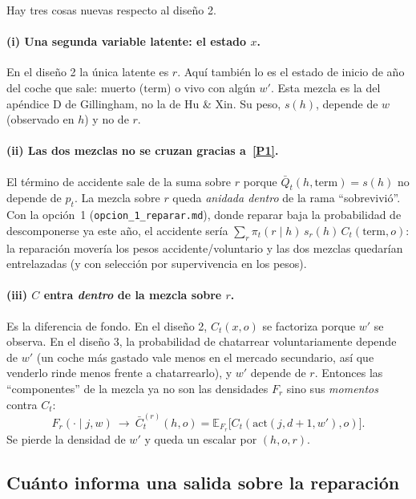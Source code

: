 \documentclass[11pt]{article}
\newcommand{\code}[1]{\texttt{\small #1}}
\newcommand{\act}{\mathrm{act}}
\newcommand{\term}{\mathrm{term}}
\newcommand{\1}{\mathbf{1}}
\newcommand{\Qbar}{\bar Q}
\begin{document}
Hay tres cosas nuevas respecto al diseño 2.

\paragraph{(i) Una segunda variable latente: el estado $x$.} En el diseño 2 la única latente
es $r$. Aquí también lo es el estado de inicio de año del coche que sale: muerto
($\term$) o vivo con algún $w'$. Esta mezcla es la del apéndice D de Gillingham, no la de
Hu \& Xin. Su peso, $s(h)$, depende de $w$ (observado en $h$) y no de $r$.

\paragraph{(ii) Las dos mezclas no se cruzan gracias a~\ref{P1}.} El término de accidente
sale de la suma sobre $r$ porque $\Qbar_t(h,\term)=s(h)$ no depende de $p_t$. La mezcla
sobre $r$ queda \emph{anidada dentro} de la rama ``sobrevivió''. Con la opción~1
(\code{opcion\_1\_reparar.md}), donde reparar baja la probabilidad de descomponerse ya este
año, el accidente sería $\sum_r\pi_t(r\mid h)\,s_r(h)\,C_t(\term,o)$: la reparación movería
los pesos accidente/voluntario y las dos mezclas quedarían entrelazadas (y con selección por
supervivencia en los pesos).

\paragraph{(iii) $C$ entra \emph{dentro} de la mezcla sobre $r$.} Es la diferencia de fondo.
En el diseño 2, $C_t(x,o)$ se factoriza porque $w'$ se observa. En el diseño 3, la
probabilidad de chatarrear voluntariamente depende de $w'$ (un coche más gastado vale menos
en el mercado secundario, así que venderlo rinde menos frente a chatarrearlo), y $w'$ depende
de $r$. Entonces las ``componentes'' de la mezcla ya no son las densidades $F_r$ sino sus
\emph{momentos} contra $C_t$:
\[
  F_r(\cdot\mid j,w)\ \longrightarrow\ \bar C^{(r)}_t(h,o)=\mathbb E_{F_r}\bigl[C_t(\act(j,d+1,w'),o)\bigr].
\]
Se pierde la densidad de $w'$ y queda un escalar por $(h,o,r)$.

\subsection{Cuánto informa una salida sobre la reparación}
\end{document}
